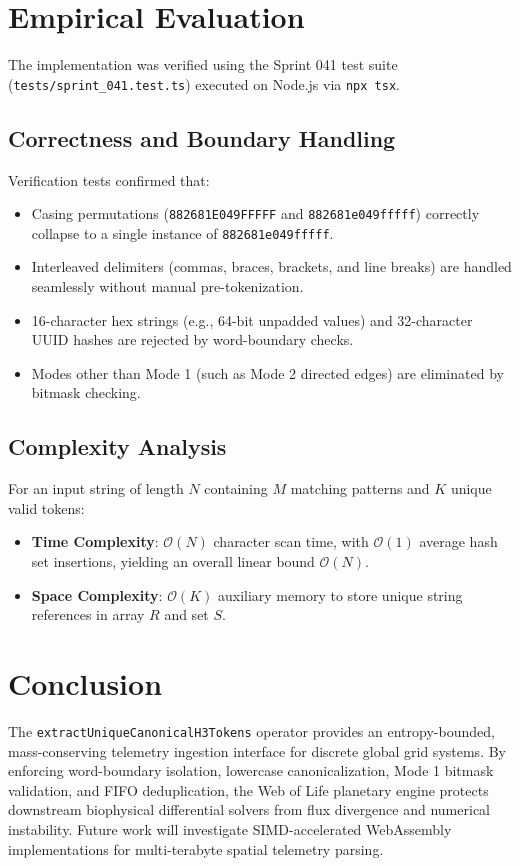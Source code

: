 \documentclass[10pt,journal,compsoc]{IEEEtran}
\begin{document}
\section{Empirical Evaluation}
The implementation was verified using the Sprint 041 test suite (\texttt{tests/sprint\_041.test.ts}) executed on Node.js via \texttt{npx tsx}. 

\subsection{Correctness and Boundary Handling}
Verification tests confirmed that:
\begin{itemize}
    \item Casing permutations (\texttt{882681E049FFFFF} and \texttt{882681e049fffff}) correctly collapse to a single instance of \texttt{882681e049fffff}.
    \item Interleaved delimiters (commas, braces, brackets, and line breaks) are handled seamlessly without manual pre-tokenization.
    \item 16-character hex strings (e.g., 64-bit unpadded values) and 32-character UUID hashes are rejected by word-boundary checks.
    \item Modes other than Mode 1 (such as Mode 2 directed edges) are eliminated by bitmask checking.
\end{itemize}

\subsection{Complexity Analysis}
For an input string of length $N$ containing $M$ matching patterns and $K$ unique valid tokens:
\begin{itemize}
    \item \textbf{Time Complexity}: $\mathcal{O}(N)$ character scan time, with $\mathcal{O}(1)$ average hash set insertions, yielding an overall linear bound $\mathcal{O}(N)$.
    \item \textbf{Space Complexity}: $\mathcal{O}(K)$ auxiliary memory to store unique string references in array $R$ and set $S$.
\end{itemize}

\section{Conclusion}
The \texttt{extractUniqueCanonicalH3Tokens} operator provides an entropy-bounded, mass-conserving telemetry ingestion interface for discrete global grid systems. By enforcing word-boundary isolation, lowercase canonicalization, Mode 1 bitmask validation, and FIFO deduplication, the Web of Life planetary engine protects downstream biophysical differential solvers from flux divergence and numerical instability. Future work will investigate SIMD-accelerated WebAssembly implementations for multi-terabyte spatial telemetry parsing.
\end{document}
